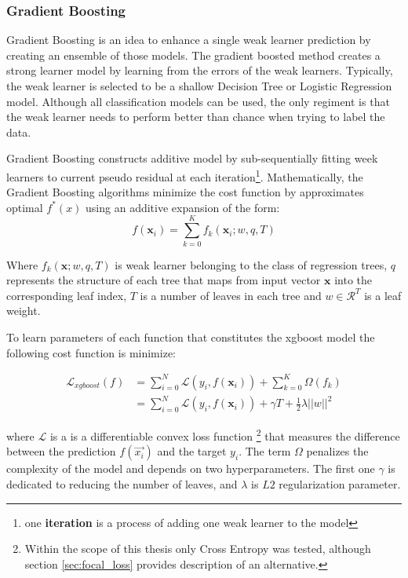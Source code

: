 \subsubsection{Gradient Boosting}

Gradient Boosting is an idea to enhance a single weak learner prediction by creating an ensemble of those models. The gradient boosted method creates a strong learner model by learning from the errors of the weak learners. Typically, the weak learner is selected to be a shallow Decision Tree or Logistic Regression model. Although all classification models can be used, the only regiment is that the weak learner needs to perform better than chance when trying to label the data.     

Gradient Boosting constructs additive model by sub-sequentially fitting week learners to current pseudo residual at each iteration\footnote{one \textbf{iteration} is a process of adding one weak learner to the model}. Mathematically, the Gradient Boosting algorithms minimize the cost function by approximates optimal $f^*(x)$ using an additive expansion of the form:
\begin{equation} 
    f(\textbf{x}_i) = \sum_{k=0}^{K} f_k(\textbf{x}_i; w, q, T)
\end{equation}

Where $f_k(\textbf{x}; w, q, T)$ is weak learner belonging to the class of regression trees, $q$ represents the structure of each tree that maps from input vector $\textbf{x}$ into the corresponding leaf index, $T$ is a number of leaves in each tree and $w \in \mathcal{R}^{T}$ is a leaf weight.

To learn parameters of each function that constitutes the xgboost model the following cost function is minimize:

\begin{equation}
\label{eq:xgboost_loss}
\begin{split}
    \mathcal{L}_{xgboost}(f) &= \sum_{i=0}^{N} \mathcal{L}(y_i, f(\mathbf{x}_i)) + \sum_{k=0}^{K}\Omega(f_{k})  \\ 
&= \sum_{i=0}^{N} \mathcal{L}(y_i, f(\mathbf{x}_i))  + \gamma T +\frac{1}{2}\lambda ||w||^{2}
\end{split}
\end{equation}

where $\mathcal{L}$ is a is a differentiable convex loss function \footnote{Within the scope of this thesis only Cross Entropy was tested, although section \ref{sec:focal_loss} provides description of an alternative.} that measures the difference between the prediction $f(\vec{x_i})$ and the target $y_i$. 
The term $\Omega$ penalizes the complexity of the model and depends on two hyperparameters. The first one $\gamma$ is dedicated to reducing the number of leaves, and $\lambda$ is $L2$ regularization parameter. 

